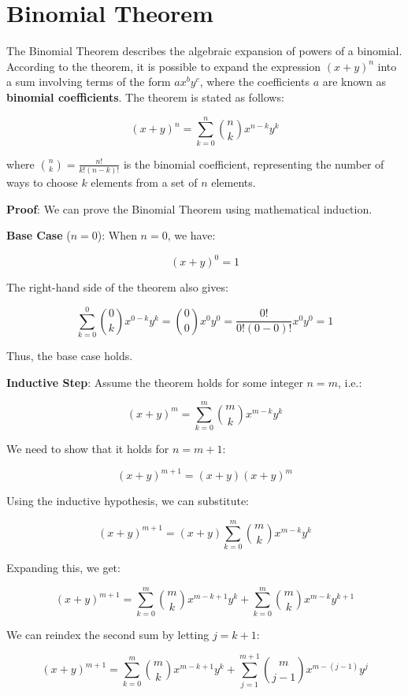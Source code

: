 \documentclass[12pt, letterpaper, oneside]{article}
\begin{document}
\section{Binomial Theorem}

The Binomial Theorem describes the algebraic expansion of powers of a binomial. According to the theorem, it is possible
to expand the expression \((x + y)^n\) into a sum involving terms of the form \(ax^by^c\), where the coefficients \(a\)
are known as \textbf{binomial coefficients}. The theorem is stated as follows:

\[(x + y)^n = \sum_{k=0}^{n} \binom{n}{k} x^{n-k} y^k\]

where \(\binom{n}{k} = \frac{n!}{k!(n-k)!}\) is the binomial coefficient, representing the number of ways to choose \(k\)
elements from a set of \(n\) elements.

\textbf{Proof}: We can prove the Binomial Theorem using mathematical induction.

\textbf{Base Case} (\(n = 0\)): When \(n = 0\), we have:

\[(x + y)^0 = 1\]

The right-hand side of the theorem also gives:

\[\sum_{k=0}^{0} \binom{0}{k} x^{0-k} y^k = \binom{0}{0} x^0 y^0 = \frac{0!}{0!(0-0)!} x^0 y^0 = 1\]

Thus, the base case holds.

\textbf{Inductive Step}: Assume the theorem holds for some integer \(n = m\), i.e.:

\[(x + y)^m = \sum_{k=0}^{m} \binom{m}{k} x^{m-k} y^k\]

We need to show that it holds for \(n = m + 1\):

\[(x + y)^{m+1} = (x + y)(x + y)^m\]

Using the inductive hypothesis, we can substitute:

\[(x + y)^{m+1} = (x + y) \sum_{k=0}^{m} \binom{m}{k} x^{m-k} y^k\]

Expanding this, we get:

\[(x + y)^{m+1} = \sum_{k=0}^{m} \binom{m}{k} x^{m-k+1} y^k + \sum_{k=0}^{m} \binom{m}{k} x^{m-k} y^{k+1}\]

We can reindex the second sum by letting \(j = k + 1\):

\[(x + y)^{m+1} = \sum_{k=0}^{m} \binom{m}{k} x^{m-k+1} y^k + \sum_{j=1}^{m+1} \binom{m}{j-1} x^{m-(j-1)} y^j\]
\end{document}
